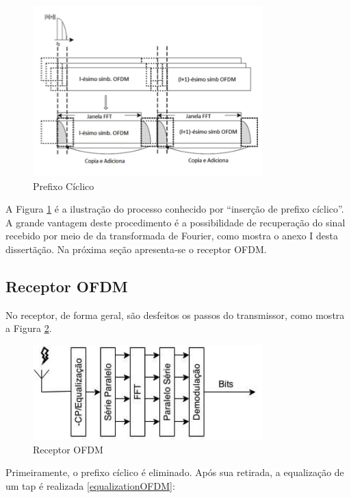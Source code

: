 \begin{figure}[h!]
\centering
\includegraphics[width=3.5in]{cp.png} %
\caption{Prefixo Cíclico  \cite{tcc9}}
\label{cp}
\end{figure}
		
\par A Figura \ref{cp} é a ilustração do processo conhecido por “inserção de prefixo cíclico”. A grande vantagem deste procedimento é a possibilidade de recuperação do sinal recebido por meio de da transformada de Fourier, como mostra o anexo I desta dissertãção. Na próxima seção apresenta-se o receptor OFDM. 

\subsection{Receptor OFDM}

\par No receptor, de forma geral, são desfeitos os passos do transmissor, como mostra a Figura \ref{rec_OFDM}.	

\begin{figure}[h!]
\centering
\includegraphics[width=3.5in]{recOFDM.png} %
\caption{Receptor OFDM  \cite{tcc9}}
\label{rec_OFDM}
\end{figure}	

\par Primeiramente, o prefixo cíclico é eliminado. Após sua retirada, a equalização de um tap é realizada \ref{equalizationOFDM}:

